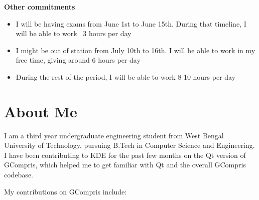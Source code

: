 \documentclass[preprint,12pt]{elsarticle}
\begin{document}
\textbf{Other commitments}

\begin{itemize}
\item I will be having exams from June 1st to June 15th. During that timeline, I will be able to work ~3 hours per day
\item I might be out of station from July 10th to 16th. I will be able to work in my free time, giving around 6 hours per day
\item During the rest of the period, I will be able to work 8-10 hours per day
\end{itemize}

\section{About Me}
\label{S:1}

I am a third year undergraduate engineering student from West Bengal University of Technology, pursuing B.Tech in Computer Science and Engineering. I have been contributing to KDE for the past few months on the Qt version of GCompris, which helped me to get familiar with Qt and the overall GCompris codebase.

My contributions on GCompris include:
\end{document}
